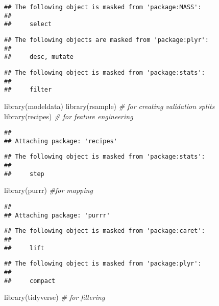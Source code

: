 \documentclass[
]{article}
\newenvironment{Shaded}{\begin{snugshade}}{\end{snugshade}}
\newcommand{\CommentTok}[1]{\textcolor[rgb]{0.56,0.35,0.01}{\textit{#1}}}
\newcommand{\FunctionTok}[1]{\textcolor[rgb]{0.00,0.00,0.00}{#1}}
\newcommand{\NormalTok}[1]{#1}
\begin{document}
\begin{verbatim}
## The following object is masked from 'package:MASS':
## 
##     select
\end{verbatim}

\begin{verbatim}
## The following objects are masked from 'package:plyr':
## 
##     desc, mutate
\end{verbatim}

\begin{verbatim}
## The following object is masked from 'package:stats':
## 
##     filter
\end{verbatim}

\begin{Shaded}
\begin{Highlighting}[]
\FunctionTok{library}\NormalTok{(modeldata)}
\FunctionTok{library}\NormalTok{(rsample)    }\CommentTok{\# for creating validation splits}
\FunctionTok{library}\NormalTok{(recipes)    }\CommentTok{\# for feature engineering}
\end{Highlighting}
\end{Shaded}

\begin{verbatim}
## 
## Attaching package: 'recipes'
\end{verbatim}

\begin{verbatim}
## The following object is masked from 'package:stats':
## 
##     step
\end{verbatim}

\begin{Shaded}
\begin{Highlighting}[]
\FunctionTok{library}\NormalTok{(purrr)      }\CommentTok{\#for mapping}
\end{Highlighting}
\end{Shaded}

\begin{verbatim}
## 
## Attaching package: 'purrr'
\end{verbatim}

\begin{verbatim}
## The following object is masked from 'package:caret':
## 
##     lift
\end{verbatim}

\begin{verbatim}
## The following object is masked from 'package:plyr':
## 
##     compact
\end{verbatim}

\begin{Shaded}
\begin{Highlighting}[]
\FunctionTok{library}\NormalTok{(tidyverse)  }\CommentTok{\# for filtering }
\end{Highlighting}
\end{Shaded}
\end{document}
